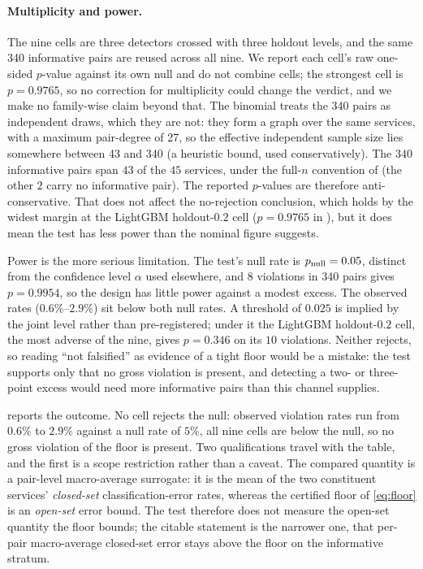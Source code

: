\paragraph{Multiplicity and power.}
The nine cells are three detectors crossed with three holdout levels, and the
same 340 informative pairs are reused across all nine. We report each cell's
raw one-sided $p$-value against its own null and do not combine cells; the
strongest cell is $p = 0.9765$, so no correction for multiplicity could change
the verdict, and we make no family-wise claim beyond that. The binomial treats
the 340 pairs as independent draws, which they are not: they form a graph over
the same services, with a maximum pair-degree of 27, so the effective
independent sample size lies somewhere between 43 and 340 (a heuristic bound,
used conservatively). The $340$
informative pairs span $43$ of the $45$ services, under the full-$n$ convention
of  (the other $2$ carry no informative pair). The reported
$p$-values are therefore anti-conservative. That does not affect the
no-rejection conclusion, which holds by the widest margin at the LightGBM
holdout-$0.2$ cell ($p = 0.9765$ in ), but
it does mean the test has less power than the nominal figure suggests.

Power is the more serious limitation. The test's null rate is
$p_{\mathrm{null}} = 0.05$, distinct from the confidence level $\alpha$ used elsewhere, and
8 violations in 340 pairs gives $p = 0.9954$, so the design has little power
against a modest excess. The observed rates ($0.6\%$--$2.9\%$) sit below both
null rates. A threshold of $0.025$ is implied by the joint level rather than
pre-registered; under it the LightGBM holdout-$0.2$ cell, the most adverse of the
nine, gives $p = 0.346$ on its $10$ violations.
Neither rejects, so reading ``not falsified'' as evidence of a tight floor would
be a mistake: the test supports only that no gross violation is present, and
detecting a two- or three-point excess would need more informative pairs than
this channel supplies.

 reports the outcome. No cell rejects the null: observed
violation rates run from $0.6\%$ to $2.9\%$ against a null rate of $5\%$, all
nine cells are below the null, so no gross violation of the floor is present. Two
qualifications travel with the table, and the first is a scope restriction
rather than a caveat. The compared quantity is a pair-level macro-average
surrogate: it is the mean of the two constituent services' \emph{closed-set}
classification-error rates, whereas the certified floor of \eqref{eq:floor} is an
\emph{open-set} error bound. The test therefore does not measure the open-set
quantity the floor bounds; the citable statement is the narrower one, that
per-pair macro-average closed-set error stays above the floor on the informative
stratum.

